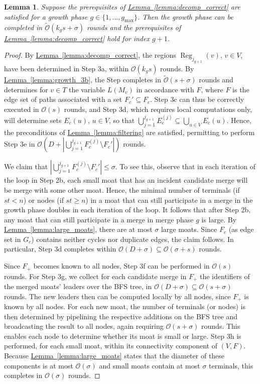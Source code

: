 \documentclass[letterpaper,11pt]{article}
\newtheorem{lemma}[theorem]{Lemma}
\newcommand{\namedref}[2]{\hyperref[#2]{#1~\ref*{#2}}}
\newcommand{\lemmaref}[1]{\namedref{Lemma}{#1}}
\newcommand{\BO}{\mathcal{O}}
\newcommand{\sO}{\tilde{\mathcal{O}}}
\DeclareMathOperator{\reg}{Reg}
\begin{document}
\begin{lemma}\label{lemma:growth_phase}
Suppose the prerequisites of \lemmaref{lemma:decomp_correct} are satisfied for a
growth phase $g\in \{1,\ldots,g_{\max}\}$. Then the growth phase can be
completed in $\sO(k_gs+\sigma)$ rounds and the prerequisites of
\lemmaref{lemma:decomp_correct} hold for index $g+1$.
\end{lemma}
\begin{proof}By \lemmaref{lemma:decomp_correct}, the regions $\reg_{j_{g+1}}(v)$, $v\in V$,
have been determined in Step 3a, within $\BO(k_g s)$ rounds. By
\lemmaref{lemma:growth_3b}, the Step completes in $\sO(s+\sigma)$ rounds and
determines for $v\in T$ the variable $L(M_v)$ in accordance with $F$, where $F$
is the edge set of paths associated with a set $F_c'\subseteq F_c$. Step 3c can
thus be correctly executed in $\BO(s)$ rounds, and Step 3d, which requires local
computations only, will determine sets $E_c(u)$, $u\in V$, so that
$\bigcup_{j=1}^{j_{g+1}}E_c^{(j)}\subseteq \bigcup_{u\in V}E_c(u)$. Hence, the
preconditions of \lemmaref{lemma:filtering} are satisfied, permitting to perform
Step 3e in $\BO(D+|\bigcup_{j=1}^{j_{g+1}}F_c^{(j)}\setminus F_c'|)$ rounds.

We claim that $|\bigcup_{j=1}^{j_{g+1}}F_c^{(j)}\setminus F_c'|\leq \sigma$. To
see this, observe that in each iteration of the loop in Step 2b, each small moat
that has an incident candidate merge will be merge with some other moat. Hence,
the minimal number of terminals (if $st<n$) or nodes (if $st\geq n$) in a moat
that can still participate in a merge in the growth phase doubles in each
iteration of the loop. It follows that after Step 2b, any moat that can still
participate in a merge in merge phase $g$ is large. By
\lemmaref{lemma:large_moats}, there are at most $\sigma$ large moats. Since
$F_c$ (as edge set in $G_c$) contains neither cycles nor duplicate edges, the
claim follows. In particular, Step 3d completes within $\BO(D+\sigma)\subseteq
\BO(\sigma+s)$ rounds.

Since $F_+$ becomes known to all nodes, Step 3f can be performed in $\BO(s)$
rounds. For Step 3g, we collect for each candidate merge in $F_+$ the
identifiers of the merged moats' leaders over the BFS tree, in
$\BO(D+\sigma)\subseteq \BO(s+\sigma)$ rounds. The new leaders then can be
computed locally by all nodes, since $F_+$ is known by all nodes. For each new
moat, the number of terminals (or nodes) is then determined by pipelining the
respective additions on the BFS tree and broadcasting the result to all nodes,
again requiring $\BO(s+\sigma)$ rounds. This enables each node to determine
whether its moat is small or large. Step 3h is performed, for each small moat,
within its connectivity component of $(V,F)$. Because
\lemmaref{lemma:large_moats} states that the diameter of these components is at
most $\BO(\sigma)$ and small moats contain at most $\sigma$ terminals, this
completes in $\BO(\sigma)$ rounds.


\end{proof}
\end{document}
